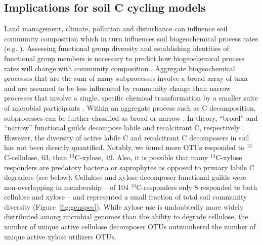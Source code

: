 \subsection{Implications for soil C cycling models}
Land management, climate, pollution and disturbance can influence soil
community composition \citep{McGuire2010} which in turn influences soil
biogeochemical process rates (e.g. \citep{Berlemont2014a}). Assessing
functional group diversity and establishing identities of functional group
members is necessary to predict how biogeochemical process rates will change
with community composition \citep{Schimel_1995,McGuire2010}. Aggregate
biogeochemical processes that are the sum of many subprocesses involve a broad
array of taxa and are assumed to be less influenced by community change than
narrow processes that involve a single, specific chemical transformation by
a smaller suite of microbial participants \citep{Schimel_1995,McGuire2010}.
Within an aggregate process such as C decomposition, subprocesses can be
further classified as broad or narrow \citep{McGuire2010}. In theory,
``broad'' and ``narrow'' functional guilds decompose labile and
recalcitrant C, respectively \citep{McGuire2010}. However, the diversity of
active labile C and recalcitrant C decomposers in soil has not been directly
quantified. Notably, we found more OTUs responded to $^{13}$C-cellulose, 63,
than $^{13}$C-xylose, 49. Also, it is possible that many $^{13}$C-xylose
responders are predatory bacteria or saprophytes as opposed to primary labile
C degraders (see below). Cellulose and xylose decomposer functional guilds were
non-overlapping in membership -- of
104 $^{13}$C-responders only 8 responded to both cellulose and xylose -- and
represented a small fraction of total soil community diversity
(Figure~\ref{fig:genspec}). While xylose use is undoubtedly more widely
distributed among microbial genomes than the ability to degrade cellulose, the
number of unique active cellulose decomposer OTUs outnumbered the number of
unique active xylose utilizers OTUs.



